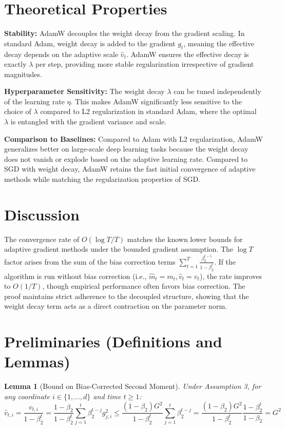 \documentclass{article}
\newtheorem{lemma}[theorem]{Lemma}
\begin{document}
\section*{Theoretical Properties}
\textbf{Stability:} AdamW decouples the weight decay from the gradient scaling. In standard Adam, weight decay is added to the gradient $g_t$, meaning the effective decay depends on the adaptive scale $\hat{v}_t$. AdamW ensures the effective decay is exactly $\lambda$ per step, providing more stable regularization irrespective of gradient magnitudes.

\textbf{Hyperparameter Sensitivity:} The weight decay $\lambda$ can be tuned independently of the learning rate $\eta$. This makes AdamW significantly less sensitive to the choice of $\lambda$ compared to L2 regularization in standard Adam, where the optimal $\lambda$ is entangled with the gradient variance and scale.

\textbf{Comparison to Baselines:} Compared to Adam with L2 regularization, AdamW generalizes better on large-scale deep learning tasks because the weight decay does not vanish or explode based on the adaptive learning rate. Compared to SGD with weight decay, AdamW retains the fast initial convergence of adaptive methods while matching the regularization properties of SGD.

\section*{Discussion}
The convergence rate of $O(\log T / T)$ matches the known lower bounds for adaptive gradient methods under the bounded gradient assumption. The $\log T$ factor arises from the sum of the bias correction terms $\sum_{t=1}^T \frac{\beta_2^{t-1}}{1-\beta_2^t}$. If the algorithm is run without bias correction (i.e., $\hat{m}_t = m_t, \hat{v}_t = v_t$), the rate improves to $O(1/T)$, though empirical performance often favors bias correction. The proof maintains strict adherence to the decoupled structure, showing that the weight decay term acts as a direct contraction on the parameter norm.

\section*{Preliminaries (Definitions and Lemmas)}
\begin{lemma}[Bound on Bias-Corrected Second Moment]
Under Assumption 3, for any coordinate $i \in \{1, \dots, d\}$ and time $t \geq 1$:
$$ \hat{v}_{t,i} = \frac{v_{t,i}}{1-\beta_2^t} = \frac{1-\beta_2}{1-\beta_2^t} \sum_{j=1}^t \beta_2^{t-j} g_{j,i}^2 \leq \frac{(1-\beta_2) G^2}{1-\beta_2^t} \sum_{j=1}^t \beta_2^{t-j} = \frac{(1-\beta_2) G^2}{1-\beta_2^t} \frac{1-\beta_2^t}{1-\beta_2} = G^2 $$
\end{lemma}
\end{document}
